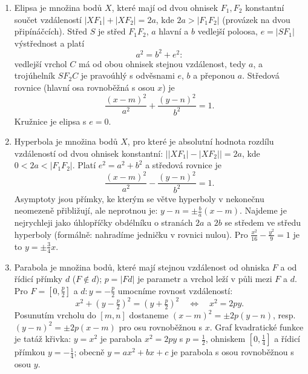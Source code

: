 \begin{enumerate}[label=\textbf{\arabic*.}, leftmargin=*, itemsep=0.8em]
  \item {}
  Elipsa je množina bodů $X$, které mají od dvou ohnisek $F_1, F_2$ konstantní součet vzdáleností $|XF_1| + |XF_2| = 2a$, kde $2a > |F_1F_2|$ (provázek na dvou připínáčcích). Střed $S$ je střed $F_1F_2$, $a$ hlavní a $b$ vedlejší poloosa, $e = |SF_1|$ výstřednost a platí
  \begin{equation*}
    a^2 = b^2 + e^2:
  \end{equation*}
  vedlejší vrchol $C$ má od obou ohnisek stejnou vzdálenost, tedy $a$, a trojúhelník $SF_2C$ je pravoúhlý s odvěsnami $e$, $b$ a přeponou $a$. Středová rovnice (hlavní osa rovnoběžná s osou $x$) je
  \begin{equation*}
    \frac{{(x - m)}^2}{a^2} + \frac{{(y - n)}^2}{b^2} = 1.
  \end{equation*}
  Kružnice je elipsa s $e = 0$. 

  \item {}
  Hyperbola je množina bodů $X$, pro které je absolutní hodnota rozdílu vzdáleností od dvou ohnisek konstantní: $\big||XF_1| - |XF_2|\big| = 2a$, kde $0 < 2a < |F_1F_2|$. Platí $e^2 = a^2 + b^2$ a středová rovnice je
  \begin{equation*}
    \frac{{(x - m)}^2}{a^2} - \frac{{(y - n)}^2}{b^2} = 1.
  \end{equation*}
  Asymptoty jsou přímky, ke kterým se větve hyperboly v nekonečnu neomezeně přibližují, ale neprotnou je: $y - n = \pm\frac{b}{a}(x - m)$. Najdeme je nejrychleji jako úhlopříčky obdélníku o stranách $2a$ a $2b$ se středem ve středu hyperboly (formálně: nahradíme jedničku v rovnici nulou). Pro $\frac{x^2}{16} - \frac{y^2}{9} = 1$ je to $y = \pm\frac{3}{4}x$. 

  \item {}
  Parabola je množina bodů, které mají stejnou vzdálenost od ohniska $F$ a od řídicí přímky $d$ ($F\notin d$); $p = |Fd|$ je parametr a vrchol leží v půli mezi $F$ a $d$. Pro $F = \left[0, \frac{p}{2}\right]$ a $d: y = -\frac{p}{2}$ umocníme rovnost vzdáleností:
  \begin{equation*}
    x^2 + {\left(y - \tfrac{p}{2}\right)}^2 = {\left(y + \tfrac{p}{2}\right)}^2 \quad\Leftrightarrow\quad x^2 = 2py.
  \end{equation*}
  Posunutím vrcholu do $[m, n]$ dostaneme ${(x - m)}^2 = \pm 2p(y - n)$, resp. ${(y - n)}^2 = \pm 2p(x - m)$ pro osu rovnoběžnou s $x$. Graf kvadratické funkce je tatáž křivka: $y = x^2$ je parabola $x^2 = 2py$ s $p = \frac{1}{2}$, ohniskem $\left[0, \frac{1}{4}\right]$ a řídicí přímkou $y = -\frac{1}{4}$; obecně $y = ax^2 + bx + c$ je parabola s osou rovnoběžnou s osou $y$. 


\end{enumerate}
